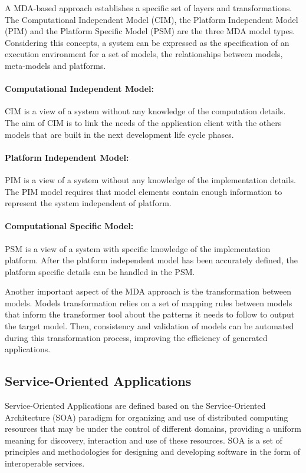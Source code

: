 {A MDA-based approach establishes a specific set of layers and transformations.
The Computational Independent Model (CIM), the Platform Independent Model (PIM)
and the  Platform Specific Model (PSM) are the three MDA model types.
Considering this concepts, a system can be expressed as the specification of an
execution environment for a set of models, the relationships between models,
meta-models and platforms. 

\paragraph{Computational Independent Model:} CIM is a view of a system without
any knowledge of the computation details. The aim of CIM is to link the needs of
the application client with the others models that are built in the next
development life cycle phases.

\paragraph{Platform Independent Model:} PIM is a view of a system without any knowledge of the 
implementation details. The PIM model requires that model elements contain enough 
information to represent the system independent of platform.

\paragraph{Computational Specific Model:} PSM is a view of a system with
specific knowledge of the implementation platform. After the platform
independent model has been accurately defined, the platform specific details can
be handled in the PSM. 


 Another important aspect of the MDA approach is the transformation between 
models. Models transformation relies on a set of mapping rules between models
that inform the transformer tool about the patterns it needs to follow to output
the target model. Then, consistency and validation of models can be automated
during this transformation process, improving the efficiency of
generated applications.

\subsection{Service-Oriented Applications}

Service-Oriented Applications are defined based on the Service-Oriented
Architecture (SOA) \cite{2,Rosen08,somf} paradigm for organizing and use of
distributed computing resources that may be under the control of different domains, providing a uniform meaning for discovery, interaction and
use of these resources. SOA is a set of principles and methodologies for
designing and developing software in the form of interoperable services. 

}
